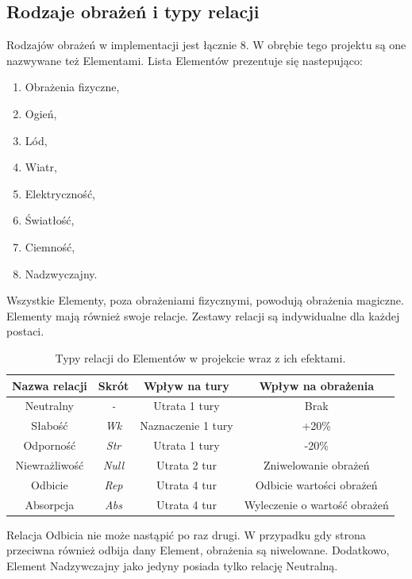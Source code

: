 \documentclass{SGGW-thesis}
\begin{document}
\subsection{Rodzaje obrażeń i typy relacji}
Rodzajów obrażeń w implementacji jest łącznie 8. W obrębie tego projektu są one nazwywane też Elementami. Lista Elementów prezentuje się nastepująco:
\begin{enumerate}
  \item Obrażenia fizyczne,
  \item Ogień,
  \item Lód,
  \item Wiatr,
  \item Elektryczność,
  \item Światłość,
  \item Ciemność,
  \item Nadzwyczajny.
\end{enumerate}
Wszystkie Elementy, poza obrażeniami fizycznymi, powodują obrażenia magiczne. 
Elementy mają również swoje relacje. Zestawy relacji są indywidualne dla każdej postaci.
\begin{table}[H]
  \begin{center}
    \caption{Typy relacji do Elementów w projekcie wraz z ich efektami.}
  \begin{tabular}{||c c c c||} 
   \hline
   Nazwa relacji & Skrót & Wpływ na tury & Wpływ na obrażenia \\ [0.5ex] 
   \hline\hline
   Neutralny & \textit{-} & Utrata 1 tury & Brak \\ 
   \hline
   Słabość & \textit{Wk} & Naznaczenie 1 tury & +20\% \\
   \hline
   Odporność & \textit{Str} & Utrata 1 tury & -20\% \\
   \hline
   Niewrażliwość & \textit{Null} & Utrata 2 tur & Zniwelowanie obrażeń \\
   \hline
   Odbicie & \textit{Rep} & Utrata 4 tur & Odbicie wartości obrażeń \\
   \hline
   Absorpcja & \textit{Abs} & Utrata 4 tur & Wyleczenie o wartość obrażeń \\
   \hline
  \end{tabular}
  \end{center}
  \end{table}
Relacja Odbicia nie może nastąpić po raz drugi. W przypadku gdy strona przeciwna również odbija dany Element, obrażenia są niwelowane.
Dodatkowo, Element Nadzywczajny jako jedyny posiada tylko relację Neutralną.
\end{document}
